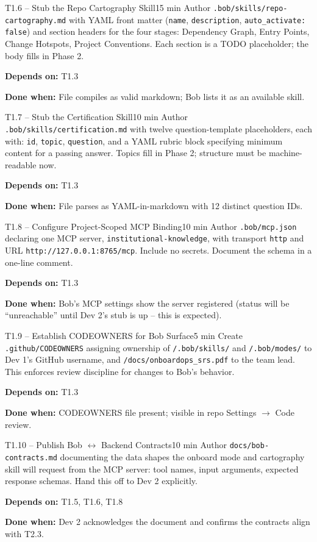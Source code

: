 \documentclass[11pt,letterpaper]{article}
\newcommand{\acceptance}[1]{\par\smallskip\textcolor{ibmgreen}{\textbf{Done when:}} #1}
\newcommand{\depends}[1]{\par\smallskip\textcolor{ibmorange}{\textbf{Depends on:}} #1}
\begin{document}
\begin{task}{T1.6 -- Stub the Repo Cartography Skill}{15 min}
Author \texttt{.bob/skills/repo-cartography.md} with YAML front matter (\texttt{name}, \texttt{description}, \texttt{auto\_activate: false}) and section headers for the four stages: Dependency Graph, Entry Points, Change Hotspots, Project Conventions. Each section is a TODO placeholder; the body fills in Phase 2.
\depends{T1.3}
\acceptance{File compiles as valid markdown; Bob lists it as an available skill.}
\end{task}

\begin{task}{T1.7 -- Stub the Certification Skill}{10 min}
Author \texttt{.bob/skills/certification.md} with twelve question-template placeholders, each with: \texttt{id}, \texttt{topic}, \texttt{question}, and a YAML rubric block specifying minimum content for a passing answer. Topics fill in Phase 2; structure must be machine-readable now.
\depends{T1.3}
\acceptance{File parses as YAML-in-markdown with 12 distinct question IDs.}
\end{task}

\begin{task}{T1.8 -- Configure Project-Scoped MCP Binding}{10 min}
Author \texttt{.bob/mcp.json} declaring one MCP server, \texttt{institutional-knowledge}, with transport \texttt{http} and URL \texttt{http://127.0.0.1:8765/mcp}. Include no secrets. Document the schema in a one-line comment.
\depends{T1.3}
\acceptance{Bob's MCP settings show the server registered (status will be ``unreachable'' until Dev 2's stub is up -- this is expected).}
\end{task}

\begin{task}{T1.9 -- Establish CODEOWNERS for Bob Surface}{5 min}
Create \texttt{.github/CODEOWNERS} assigning ownership of \texttt{/.bob/skills/} and \texttt{/.bob/modes/} to Dev 1's GitHub username, and \texttt{/docs/onboardops\_srs.pdf} to the team lead. This enforces review discipline for changes to Bob's behavior.
\depends{T1.3}
\acceptance{CODEOWNERS file present; visible in repo Settings $\rightarrow$ Code review.}
\end{task}

\begin{task}{T1.10 -- Publish Bob $\leftrightarrow$ Backend Contracts}{10 min}
Author \texttt{docs/bob-contracts.md} documenting the data shapes the onboard mode and cartography skill will request from the MCP server: tool names, input arguments, expected response schemas. Hand this off to Dev 2 explicitly.
\depends{T1.5, T1.6, T1.8}
\acceptance{Dev 2 acknowledges the document and confirms the contracts align with T2.3.}
\end{task}
\end{document}
